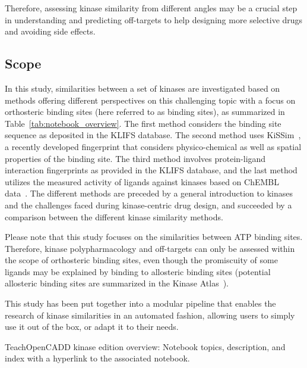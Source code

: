 \documentclass[9pt,training]{livecoms}
\begin{document}
Therefore, assessing kinase similarity from different angles may be a crucial step in understanding and predicting off-targets to help designing more selective drugs and avoiding side effects.

\subsection{Scope}
In this study, similarities between a set of kinases are investigated based on methods offering different perspectives on this challenging topic with a focus on orthosteric binding sites (here referred to as binding sites), as summarized in Table~\ref{tab:notebook_overview}. The first method considers the binding site sequence as deposited in the KLIFS database. The second method uses KiSSim~\cite{sydow_2021_kissim_chemrxiv}, a recently developed fingerprint that considers physico-chemical as well as spatial properties of the binding site. The third method involves protein-ligand interaction fingerprints as provided in the KLIFS database, and the last method utilizes the measured activity of ligands against kinases based on ChEMBL data~\cite{Gaulton_2016_nar}. The different methods are preceded by a general introduction to kinases and the challenges faced during kinase-centric drug design, and succeeded by a comparison between the different kinase similarity methods.

Please note that this study focuses on the similarities between ATP binding sites. Therefore, kinase polypharmacology and off-targets can only be assessed within the scope of orthosteric binding sites, even though the promiscuity of some ligands may be explained by binding to allosteric binding sites (potential allosteric binding sites are summarized in the Kinase Atlas~\cite{Yueh_2019_JMedChem}).  

This study has been put together into a modular pipeline that enables the research of kinase similarities in an automated fashion, allowing users to simply use it out of the box, or adapt it to their needs.

\begin{table}
    \centering
    
    \caption{TeachOpenCADD kinase edition overview: Notebook topics, description, and index with a hyperlink to the associated notebook.}
    \label{tab:notebook_overview}
\end{table}
\end{document}
